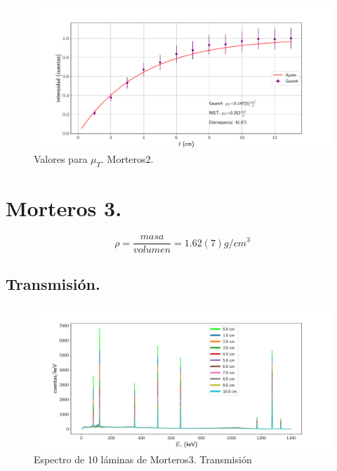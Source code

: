 \begin{figure}[H]
	\centering
	\includegraphics[width=1.0\linewidth]{Kap4/mu_T-m2.pdf}
	\caption{Valores para $\mu_T$. Morteros2.}
	\label{fig:mut-m2}
\end{figure}
 
 
 
 \section{Morteros 3.}
 

 
 

 
 \begin{equation} \label{densidad-mor3}
 \rho=\frac{masa}{volumen}=1.62(7) g/cm^3
 \end{equation}
 
 \subsection{Transmisión.}
 
\begin{figure}[H]
	\centering
	\includegraphics[width=1.0\linewidth]{Kap4/espectro_m3-M10-trans.pdf}
	\caption{Espectro de 10 láminas de Morteros3. Transmisión}
	\label{fig:espectrom3-m10-trans}
\end{figure}
 
